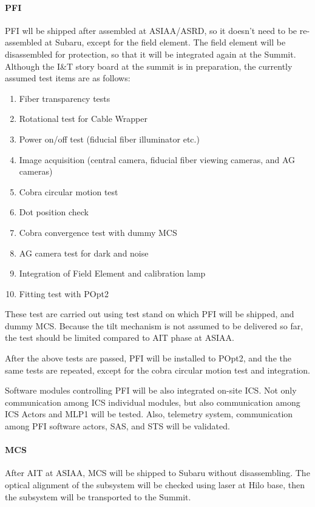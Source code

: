 \paragraph{PFI}
PFI wll be shipped after assembled at ASIAA/ASRD, so it doesn't need to be re-assembled at Subaru, except for the field element.
The field element will be disassembled for protection, so that it will be integrated again at the Summit.
Although the I\&T story board at the summit is in preparation, the currently assumed test items are as follows:
\begin{enumerate}
\item Fiber transparency tests
\item Rotational test for Cable Wrapper
\item Power on/off test (fiducial fiber illuminator etc.)
\item Image acquisition (central camera, fiducial fiber viewing cameras, and AG cameras)
\item Cobra circular motion test
\item Dot position check
\item Cobra convergence test with dummy MCS
\item AG camera test for dark and noise
\item Integration of Field Element and calibration lamp
\item Fitting test with POpt2
\end{enumerate}
These test are carried out using test stand on which PFI will be shipped, and dummy MCS.
Because the tilt mechanism is not assumed to be delivered so far, the test should be limited compared to AIT phase at ASIAA.

After the above tests are passed, PFI will be installed to POpt2, and the the same tests are repeated, except for the cobra circular motion test and integration.

Software modules controlling PFI will be also integrated on-site ICS.
Not only communication among ICS individual modules, but also communication among ICS Actors and MLP1 will be tested.
Also, telemetry system, communication among PFI software actors, SAS, and STS will be validated.

\paragraph{MCS}
After AIT at ASIAA, MCS will be shipped to Subaru without disassembling.
The optical alignment of the subsystem will be checked using laser at Hilo base, then the subsystem will be transported to the Summit.

